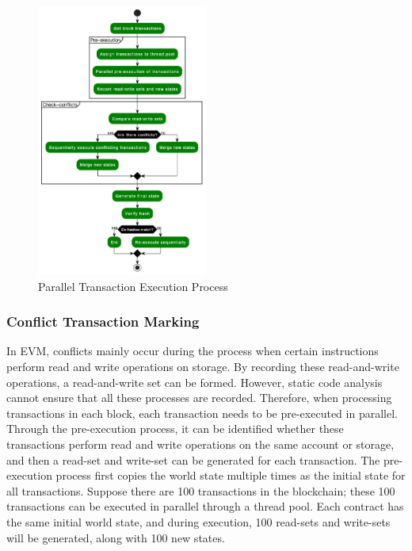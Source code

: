 \begin{figure}[!ht]
    \centering
    \includegraphics[width=0.5\textwidth]{images/paralle-execution.jpg}
    \caption{Parallel Transaction Execution Process}
    \label{fig:paralle-execution}
\end{figure}

\subsubsection{Conflict Transaction Marking}

In EVM, conflicts mainly occur during the process when certain instructions perform read and write operations on storage. By recording these read-and-write operations, a read-and-write set can be formed. However, static code analysis cannot ensure that all these processes are recorded. Therefore, when processing transactions in each block, each transaction needs to be pre-executed in parallel. Through the pre-execution process, it can be identified whether these transactions perform read and write operations on the same account or storage, and then a read-set and write-set can be generated for each transaction. The pre-execution process first copies the world state multiple times as the initial state for all transactions. Suppose there are 100 transactions in the blockchain; these 100 transactions can be executed in parallel through a thread pool. Each contract has the same initial world state, and during execution, 100 read-sets and write-sets will be generated, along with 100 new states.

